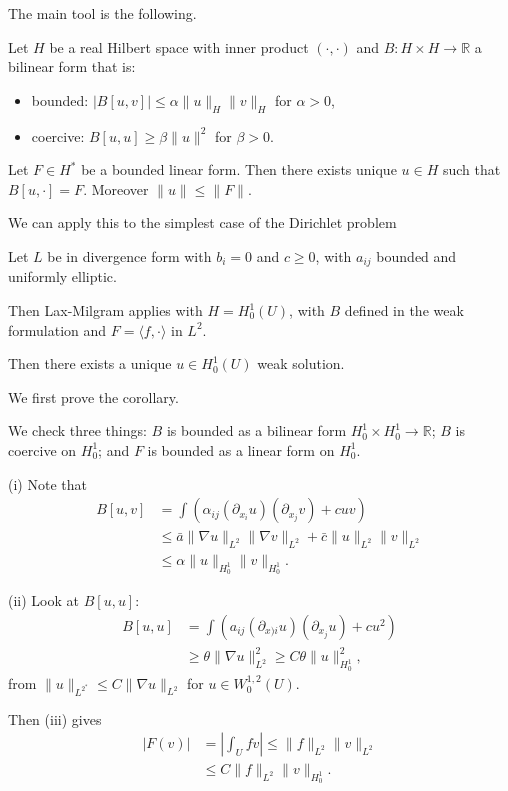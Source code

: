 \documentclass[12pt]{article}
\begin{document}
The main tool is the following.

\begin{theorem}
	Let $H$ be a real Hilbert space with inner product $(\cdot, \cdot)$ and $B : H \times H \to \mathbb{R}$ a bilinear form that is:
	\begin{itemize}
		\item bounded: $|B[u, v]| \leq \alpha \|u\|_H \|v\|_H$ for $\alpha > 0$,
		\item coercive: $B[u, u] \geq \beta \|u\|^2$ for $\beta > 0$.
	\end{itemize}
	Let $F \in H^{\ast}$ be a bounded linear form. Then there exists unique $u \in H$ such that $B[u, \cdot] = F$. Moreover $\|u\|\leq \| F\|$.
\end{theorem}

We can apply this to the simplest case of the Dirichlet problem

\begin{corollary}
	Let $L$ be in divergence form with $b_i = 0$ and $c \geq 0$, with $a_{ij}$ bounded and uniformly elliptic.

	Then Lax-Milgram applies with $H = H^1_0(U)$, with $B$ defined in the weak formulation and $F = \langle f , \cdot \rangle$ in $L^2$.

	Then there exists a unique $u \in H^1_0(U)$ weak solution.
\end{corollary}

We first prove the corollary.

\begin{proofbox}
	We check three things: $B$ is bounded as a bilinear form $H^1_0 \times H^1_0 \to \mathbb{R}$; $B$ is coercive on $H^1_0$; and $F$ is bounded as a linear form on $H^1_0$.

	(i) Note that
	\begin{align*}
		B[u, v] &= \int (\alpha_{ij} (\partial_{x_i} u) (\partial_{x_j} v) + cuv) \\
			&\leq \bar a \|\nabla u\|_{L^2} \|\nabla v\|_{L^2} + \bar c \|u\|_{L^2} \|v\|_{L^2} \\
			&\leq \alpha \|u\|_{H^1_0} \|v\|_{H^1_0}.
	\end{align*}
	
	(ii) Look at $B[u, u]$:
	\begin{align*}
		B[u, u] &= \int (a_{ij} (\partial_{x)i} u)(\partial_{x_j} u) + c u^2) \\
			&\geq \theta \|\nabla u\|^2_{L^2} \geq C \theta \|u\|^2_{H^1_0},
	\end{align*}
	from $\|u\|_{L^{2^{\ast}}} \leq C \|\nabla u\|_{L^2}$ for $u \in W^{1,2}_0(U)$.

	Then (iii) gives
	\begin{align*}
		|F(v)| &= \left| \int_U f v\right| \leq \|f\|_{L^2} \|v\|_{L^2} \\
		       &\leq C \|f\|_{L^2} \|v\|_{H^1_0}.
	\end{align*}
\end{proofbox}
\end{document}
